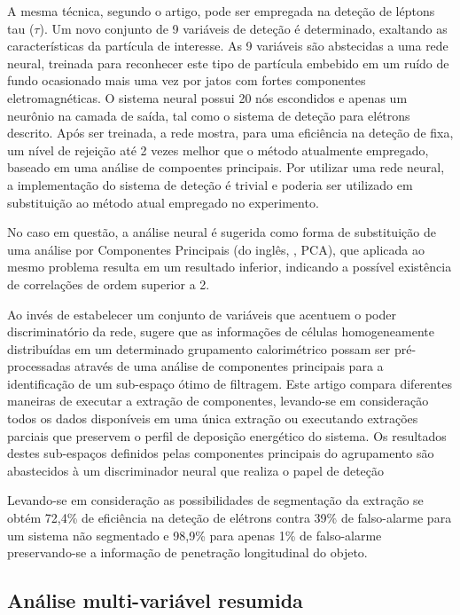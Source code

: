 A mesma técnica, segundo o artigo, pode ser empregada na deteção de léptons
tau ($\tau$). Um novo conjunto de 9 variáveis de deteção é determinado,
exaltando as características da partícula de interesse. As 9 variáveis são
abstecidas a uma rede neural, treinada para reconhecer este tipo de partícula
embebido em um ruído de fundo ocasionado mais uma vez por jatos com fortes
componentes eletromagnéticas. O sistema neural possui 20 nós escondidos e
apenas um neurônio na camada de saída, tal como o sistema de deteção para
elétrons descrito. Após ser treinada, a rede mostra, para uma eficiência na
deteção de  fixa, um nível de rejeição até 2 vezes melhor que o
método atualmente empregado, baseado em uma análise de compoentes
principais. Por utilizar uma rede neural, a implementação do sistema de
deteção é trivial e poderia ser utilizado em substituição ao método atual
empregado no experimento.

No caso em questão, a análise neural é sugerida como forma de substituição de
uma análise por Componentes Principais (do inglês, , PCA), que aplicada ao mesmo problema resulta em um resultado
inferior, indicando a possível existência de correlações de ordem superior a
2. 

Ao invés de estabelecer um conjunto de variáveis que acentuem o poder
discriminatório da rede, \cite{vassali-acat-2001} sugere que as informações de
células homogeneamente distribuídas em um determinado grupamento calorimétrico
possam ser pré-processadas através de uma análise de componentes principais
para a identificação de um sub-espaço ótimo de filtragem. Este artigo compara
diferentes maneiras de executar a extração de componentes, levando-se em
consideração todos os dados disponíveis em uma única extração ou executando
extrações parciais que preservem o perfil de deposição energético do
sistema. Os resultados destes sub-espaços definidos pelas componentes
principais do agrupamento são abastecidos à um discriminador neural que
realiza o papel de deteção

Levando-se em consideração as possibilidades de segmentação da extração
se obtém 72,4\% de eficiência na deteção de elétrons contra 39\% de
falso-alarme para um sistema não segmentado e 98,9\% para apenas 1\% de
falso-alarme preservando-se a informação de penetração longitudinal do objeto.

\subsection{Análise multi-variável resumida}

